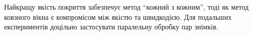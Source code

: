 \clearpage
\chapterConclusion Найкращу якість покриття забезпечує %
метод ``кожний з кожним'', тоді
як метод ковзного вікна є компромісом між %
якістю та швидкодією.  Для подальших
експериментів доцільно застосувати паралельну %
обробку пар знімків.

